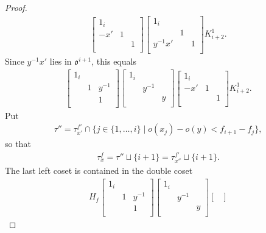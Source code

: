 \documentclass[10pt,a4paper]{amsart}
\newcommand\oo{\mathfrak{o}}
\begin{document}
\begin{proof}
\begin{align*}
\begin{bmatrix}
1_{i} & & \\
 -x' &1 &  \\
& &1  \\
\end{bmatrix} 
\begin{bmatrix}
1_{i} & & \\
 &1 &  \\
y^{-1}x' & &1 \\
\end{bmatrix} K_{i+2}^1.
\end{align*}
Since $y^{-1}x'$ lies in $\oo^{i+1}$, this equals
\begin{align*} 
\begin{bmatrix}
1_{i} & & \\
 &1 & y^{-1}  \\
 & &1  \\
\end{bmatrix}
\begin{bmatrix}
1_{i} & & \\
 &y^{-1} &  \\
 & &y  \\
\end{bmatrix}
\begin{bmatrix}
1_{i} & & \\
 -x' &1 &  \\
& &1  \\
\end{bmatrix} K_{i+2}^1.
\end{align*} 
Put
\begin{align*}
\tau'' = \tau_{x'}^{f'} \cap \{j \in \{1, \ldots, i \} \mid o(x_j) -o(y) < f_{i+1} -f_j \}, 
\end{align*} 
so that 
\begin{align}
\tau_x^f = \tau'' \sqcup \{i+1 \} = \tau_{x''}^{f'} \sqcup \{i+1 \}. \label{eq:tauxf}
\end{align} 
The last left coset is contained in the double coset
\begin{align*}
H_f \begin{bmatrix}
1_{i} & & \\
 &1 & y^{-1}  \\
 & &1  \\
\end{bmatrix}
\begin{bmatrix}
1_{i} & & \\
 &y^{-1} &  \\
 & &y  \\
\end{bmatrix}\begin{bmatrix}

\end{bmatrix}
\end{align*}
\end{proof}
\end{document}
